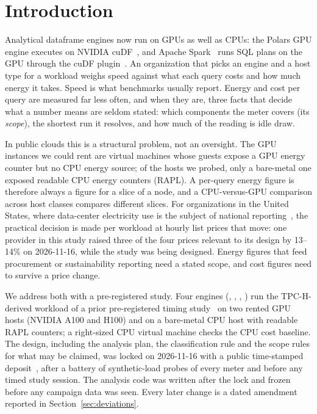 \documentclass[sigconf]{acmart}
\begin{document}
\section{Introduction}
\label{sec:intro}

Analytical dataframe engines now run on GPUs as well as CPUs: the Polars GPU engine executes
on NVIDIA cuDF~\cite{cudf_polars_docs}, and Apache Spark~\cite{armbrust2015sparksql} runs SQL
plans on the GPU through the cuDF plugin~\cite{nvidia_cudf_spark_docs}. An organization that
picks an engine and a host type for a workload weighs speed against what each query costs and
how much energy it takes. Speed is what benchmarks usually report. Energy and cost per query
are measured far less often, and when they are, three facts that decide what a number means
are seldom stated: which components the meter covers (its \emph{scope}), the shortest run it
resolves, and how much of the reading is idle draw.

In public clouds this is a structural problem, not an oversight. The GPU instances we could
rent are virtual machines whose guests expose a GPU energy counter but no CPU energy source;
of the hosts we probed, only a bare-metal one exposed readable CPU energy counters (RAPL). A per-query energy figure is
therefore always a figure for a slice of a node, and a CPU-versus-GPU comparison across host
classes compares different slices. For organizations in the United States, where data-center
electricity use is the subject of national reporting~\cite{smith2026datacenter}, the
practical decision is made per workload at hourly list prices that move: one provider in this
study raised three of the four prices relevant to its design by 13--14\% on 2026-11-16, while
the study was being designed. Energy figures that feed procurement or sustainability
reporting need a stated scope, and cost figures need to survive a price change.

We address both with a pre-registered study. Four engines (\polarscpu, \polarsgpu, \sparkcpu,
\sparkgpu) run the TPC-H-derived workload of a prior pre-registered timing
study~\cite{ejiofor2026p1} on two rented GPU hosts (NVIDIA A100 and H100) and on a bare-metal
CPU host with readable RAPL counters; a right-sized CPU virtual machine checks the CPU cost
baseline. The design, including the analysis plan, the classification rule and the scope rules
for what may be claimed, was locked on 2026-11-16 with a public time-stamped
deposit~\citelock{}, after a battery of synthetic-load probes of every meter and before any
timed study session. The analysis code was written after the lock and frozen before any campaign
data was seen. Every later change is a dated amendment reported in Section~\ref{sec:deviations}.
\end{document}
